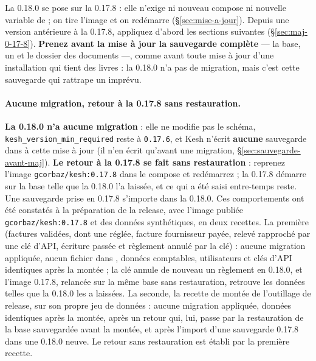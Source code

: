 \documentclass[a4paper,11pt,oneside]{article}
\begin{document}
La 0.18.0 se pose sur la 0.17.8 : elle n'exige ni nouveau compose ni nouvelle variable de  ; on tire l'image et on redémarre (\S\ref{sec:mise-a-jour}). Depuis une version antérieure à la 0.17.8, appliquez d'abord les sections suivantes (\S\ref{sec:maj-0-17-8}). \textbf{Prenez avant la mise à jour la sauvegarde complète} --- la base, un  et le dossier des documents ---, comme avant toute mise à jour d'une installation qui tient des livres : la 0.18.0 n'a pas de migration, mais c'est cette sauvegarde qui rattrape un imprévu.

\paragraph{Aucune migration, retour à la 0.17.8 sans restauration.} \textbf{La 0.18.0 n'a aucune migration} : elle ne modifie pas le schéma, \texttt{kesh\_version\_min\_required} reste à \texttt{0.17.6}, et Kesh n'écrit \textbf{aucune} sauvegarde dans  à cette mise à jour (il n'en écrit qu'avant une migration, \S\ref{sec:sauvegarde-avant-maj}). \textbf{Le retour à la 0.17.8 se fait sans restauration} : reprenez l'image \texttt{gcorbaz/kesh:0.17.8} dans le compose et redémarrez ; la 0.17.8 démarre sur la base telle que la 0.18.0 l'a laissée, et ce qui a été saisi entre-temps reste. Une sauvegarde  prise en 0.17.8 s'importe dans la 0.18.0. Ces comportements ont été constatés à la préparation de la release, avec l'image publiée \texttt{gcorbaz/kesh:0.17.8} et des données synthétiques, en deux recettes. La première (factures validées, dont une réglée, facture fournisseur payée, relevé rapproché par une clé d'API, écriture passée et règlement annulé par la clé) : aucune migration appliquée, aucun fichier dans , données comptables, utilisateurs et clés d'API identiques après la montée ; la clé annule de nouveau un règlement en 0.18.0, et l'image 0.17.8, relancée sur la même base sans restauration, retrouve les données telles que la 0.18.0 les a laissées. La seconde, la recette de montée de l'outillage de release, sur son propre jeu de données : aucune migration appliquée, données identiques après la montée, après un retour qui, lui, passe par la restauration de la base sauvegardée avant la montée, et après l'import d'une sauvegarde 0.17.8 dans une 0.18.0 neuve. Le retour sans restauration est établi par la première recette.
\end{document}
